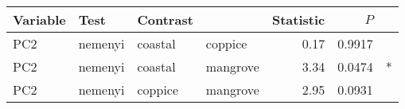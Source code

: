 
\begin{tabular}{llllrrl}
\toprule
Variable & Test & Contrast &  & Statistic & $P$ & \\
\midrule
PC2 & nemenyi & coastal & coppice & 0.17 & 0.9917 & \\
PC2 & nemenyi & coastal & mangrove & 3.34 & 0.0474 & *\\
PC2 & nemenyi & coppice & mangrove & 2.95 & 0.0931 & \\
\bottomrule
\end{tabular}

